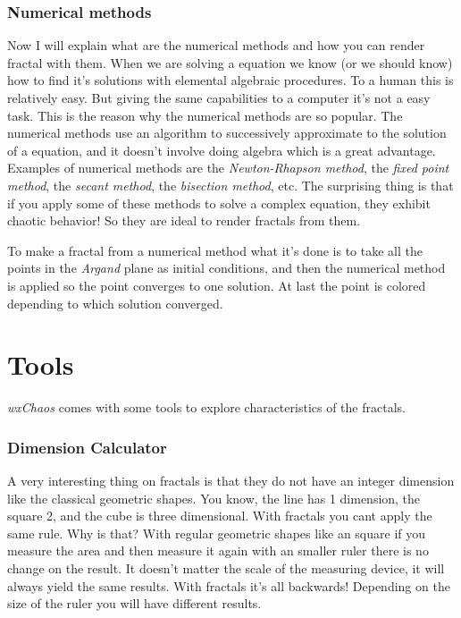 \documentclass[oneside]{book}
\begin{document}
\subsection{Numerical methods}
Now I will explain what are the numerical methods and how you can render fractal with them.
When we are solving a equation we know (or we should know) how to find it's solutions with elemental algebraic procedures. To a human this is relatively easy. But giving the same capabilities to a computer it's not a easy task. This is the reason why the numerical methods are so popular. The numerical methods use an algorithm to successively approximate to the solution of a equation, and it doesn't involve doing algebra which is a great advantage. Examples of numerical methods are the \textit{Newton-Rhapson method}, the \textit{fixed point method}, the \textit{secant method}, the \textit{bisection method}, etc. The surprising thing is that if you apply some of these methods to solve a complex equation, they exhibit chaotic behavior! So they are ideal to render fractals from them.

To make a fractal from a numerical method what it's done is to take all the points in the \textit{Argand} plane as initial conditions, and then the numerical method is applied so the point converges to one solution. At last the point is colored depending to which solution converged.

\chapter{Tools}
\textit{wxChaos} comes with some tools to explore characteristics of the fractals.

\subsection{Dimension Calculator}
A very interesting thing on fractals is that they do not have an integer dimension like the classical geometric shapes. You know, the line has 1 dimension, the square 2, and the cube is three dimensional. With fractals you cant apply the same rule. Why is that? With regular geometric shapes like an square if you measure the area and then measure it again with an smaller ruler there is no change on the result. It doesn't matter the scale of the measuring device, it will always yield the same results. With fractals it's all backwards! Depending on the size of the ruler you will have different results.
\end{document}
